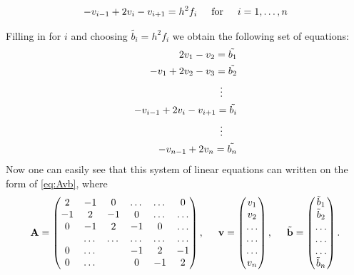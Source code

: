 \documentclass[11pt,a4paper,english]{article}
\newcommand{\ve}[1]{\mathbf{#1}} %
\newcommand{\spac}{\hspace{5mm}}
\begin{document}
\begin{gather*}
   -v_{i-1}+2v_{i}-v_{i+1}=h^2 f_i \hspace{0.5cm} \mathrm{for} \hspace{0.5cm} i=1,\dots, n 
\end{gather*}

Filling in for $i$ and choosing $\tilde{b_i} = h^2 f_i$ we obtain the following set of equations: 
\begin{align*}
	2v_{1}-v_{2}=\tilde{b_1} \\
	-v_{1}+2v_{2}-v_{3}=\tilde{b_2} \\
	\vdots \hspace{0.5cm} \\
	-v_{i-1}+2v_{i}-v_{i+1}=\tilde{b_i} \\
	\vdots \hspace{0.5cm}  \\ 
	-v_{n-1}+2v_{n}=\tilde{b_n} \\
\end{align*}
Now one can easily see that this system of linear equations can written on the form of \eqref{eq:Avb},
where 
\begin{gather*}
    \ve{A} = \begin{pmatrix}%
                           2& -1& 0 &\dots   & \dots &0 \\
                           -1 & 2 & -1 &0 &\dots &\dots \\
                           0&-1 &2 & -1 & 0 & \dots \\
                           & \dots   & \dots &\dots   &\dots & \dots \\
                           0&\dots   &  &-1 &2& -1 \\
                           0&\dots    &  & 0  &-1 & 2 \\
                      \end{pmatrix},\spac \ve{v} = \begin{pmatrix}
                           v_1\\
                           v_2\\
                           \dots \\
                          \dots  \\
                          \dots \\
                           v_n\\
                      \end{pmatrix},
  \spac \tilde{\ve{b}} = \begin{pmatrix}
                           \tilde{b}_1\\
                           \tilde{b}_2\\
                           \dots \\
                           \dots \\
                          \dots \\
                           \tilde{b}_n\\
                      \end{pmatrix}.
\end{gather*}
\end{document}
